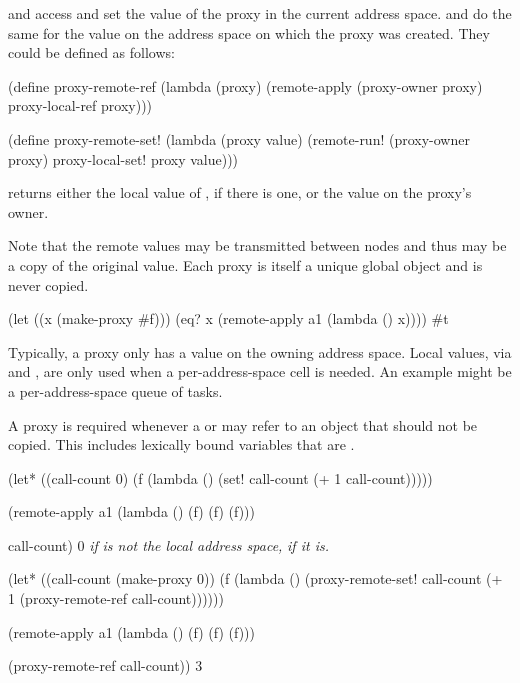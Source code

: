 \documentclass{article}
\newcommand{\evalsto}{%
\texonly{$\rightarrow$}%
\htmlonly{\code{->}}%
}
\newcommand{\cvar}[1]{%
\texonly{{\em{#1}}}%
\htmlonly{\code{\var{#1}}}%
}
\begin{document}
 and  access and set the value of
 the proxy in the current address space.
 and  do the same for the
 value on the address space on which the proxy was created.
They could be defined as follows:
\begin{example}
  (define proxy-remote-ref
    (lambda (proxy)
      (remote-apply (proxy-owner proxy)
                    proxy-local-ref
                    proxy)))

  (define proxy-remote-set!
    (lambda (proxy value)
      (remote-run! (proxy-owner proxy)
                   proxy-local-set!
                   proxy
                   value)))
\end{example}
 returns either the local value of \cvar{proxy}, if there
 is one, or the value on the proxy's owner.

Note that the remote values may be transmitted between nodes and thus may be
 a copy of the original value.
Each proxy is itself a unique global object and is never copied.
\begin{example}
  (let ((x (make-proxy \#f)))
    (eq? x (remote-apply a1 (lambda () x))))
   \evalsto \#t
\end{example}

Typically, a proxy only has a value on the owning address space.
Local values, via  and ,
 are only used when a per-address-space cell is needed.
An example might be a per-address-space queue of tasks.

A proxy is required whenever a  or  may
 refer to an object that should not be copied.
This includes lexically bound variables that are .
\begin{example}
  (let* ((call-count 0)
         (f (lambda ()
              (set! call-count (+ 1 call-count)))))

    (remote-apply a1 (lambda () (f) (f) (f)))

    call-count)
   \evalsto 0 \textit{if}  \textit{is not the local address space,}  \textit{if it is.}

  (let* ((call-count (make-proxy 0))
         (f (lambda ()
              (proxy-remote-set!
                call-count
                (+ 1 (proxy-remote-ref call-count))))))

    (remote-apply a1 (lambda () (f) (f) (f)))

    (proxy-remote-ref call-count))
   \evalsto 3
\end{example}
\end{document}
